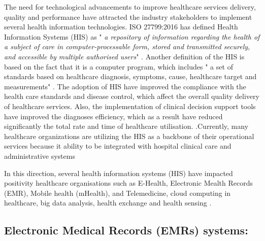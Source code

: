 
The need for technological advancements to improve healthcare services delivery, quality and performance have attracted the industry stakeholders to implement  several health information technologies. ISO 27799:2016 has defined Health Information Systems (HIS) as " \textit{a repository of information regarding the health of a subject of care in computer-processable form, stored and transmitted securely, and accessible by multiple authorised users}" \cite{TheInternationalOrganizationforStandardization2016}. Another definition of the HIS is based on the fact that it is a computer program, which  includes " a set of standards based on healthcare diagnosis, symptoms, cause, healthcare target and measurements" \cite{Pai2011}. The adoption of HIS have improved the compliance with the health care standards and disease control, which affect the overall quality delivery of healthcare services. Also, the implementation of clinical decision support tools have improved the diagnoses efficiency, which as a result have reduced significantly the total  rate and time of healthcare utilisation. \cite{Care2006,Akowuah2013}.Currently, many healthcare organizations are utilizing the HIS as a backbone of their operational services because it ability to be integrated with hospital clinical care and administrative systems\cite{Rahim2016}   

In this direction, several health information systems (HIS) have impacted positivity healthcare organisations such as E-Health, Electronic Mealth Records (EMR), Mobile health (mHealth),
and Telemedicine, cloud computing in healthcare, big data analysis, health exchange and health sensing \cite{WorldHealthOrganization2016,Yang2015}. 


\subsection{Electronic Medical Records (EMRs) systems:}

